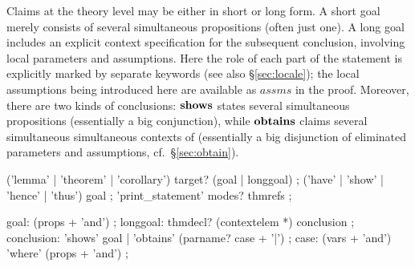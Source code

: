 Claims at the theory level may be either in short or long form.  A
short goal merely consists of several simultaneous propositions (often
just one).  A long goal includes an explicit context specification for
the subsequent conclusion, involving local parameters and assumptions.
Here the role of each part of the statement is explicitly marked by
separate keywords (see also \S\ref{sec:locale}); the local assumptions
being introduced here are available as $assms$ in
the proof.  Moreover,
there are two kinds of conclusions: ${\mathord{\mathbf{shows}}}$ states
several simultaneous propositions (essentially a big conjunction),
while ${\mathord{\mathbf{obtains}}}$ claims several simultaneous simultaneous
contexts of (essentially a big disjunction of eliminated parameters
and assumptions, cf.\ \S\ref{sec:obtain}).

\begin{rail}
  ('lemma' | 'theorem' | 'corollary') target? (goal | longgoal)
  ;
  ('have' | 'show' | 'hence' | 'thus') goal
  ;
  'print\_statement' modes? thmrefs
  ;
  
  goal: (props + 'and')
  ;
  longgoal: thmdecl? (contextelem *) conclusion
  ;
  conclusion: 'shows' goal | 'obtains' (parname? case + '|')
  ;
  case: (vars + 'and') 'where' (props + 'and')
  ;
\end{rail}

